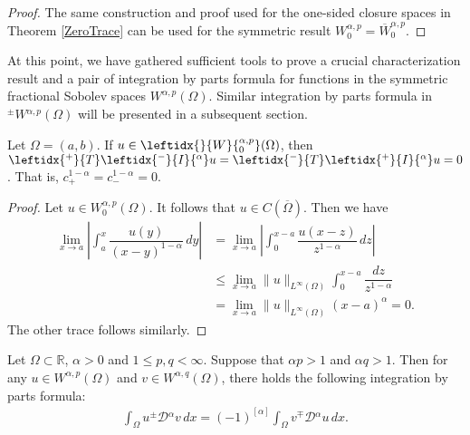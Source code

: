 \documentclass[leqno,final]{siamltex}
\numberwithin{equation}{section}
\newcommand{\Ome}{{\Omega}}
\renewcommand{\(}{\bigl(}
\renewcommand{\)}{\bigr)}
\newcommand{\R}{\mathbb{R}}
\begin{document}
    \begin{proof}
    The same construction and proof used for the one-sided closure spaces in Theorem \ref{ZeroTrace} can be used for the symmetric result $W^{\alpha,p}_{0} = \overline{W}^{\alpha,p}_{0}$.
    \end{proof}
    
    At this point, we have gathered sufficient tools to prove a crucial characterization 
    result and a pair of integration by parts 
    formula for functions in the symmetric fractional Sobolev spaces $W^{\alpha,p}(\Omega)$. Similar integration by parts formula in ${^{\pm}}{W}{^{\alpha,p}}(\Omega)$ will be presented in a subsequent section. 
    
\begin{proposition}\label{ConstantZero}
Let $\Ome=(a,b)$. If $u \in \leftidx{}{W}{^{\alpha,p}_{0}}(\Omega)$, then $\leftidx{^{+}}{T}\leftidx{^{-}}{I}{^{\alpha}} u = \leftidx{^{-}}{T} \leftidx{^{+}}{I}{^{\alpha}} u = 0$. That is, $c^{1-\alpha}_{+} = c^{1-\alpha}_{-} = 0.$
\end{proposition}

\begin{proof}
    Let $u \in W^{\alpha,p}_{0}(\Omega)$. It follows that $u \in C(\overline{\Omega})$.  
    Then we have 
    \begin{align*}
        \lim_{x \rightarrow a} \left|\int_{a}^{x} \dfrac{u(y)}{(x-y)^{1- \alpha}} \,dy \right| &= \lim_{x \rightarrow a} \left| \int_{0}^{x-a} \dfrac{u(x-z)}{z^{1-\alpha}}\,dz \right|\\
        &\leq \lim_{x \rightarrow a} \|u\|_{L^{\infty}(\Omega)} \int_{0}^{x-a} \dfrac{dz}{z^{1-\alpha}} \\ 
        &= \lim_{x\rightarrow a}\|u\|_{L^{\infty}(\Omega)} (x-a)^{\alpha} 
        = 0.
    \end{align*}
    The other trace follows similarly. 
\end{proof}


    \begin{proposition}
        Let $\Omega \subset \R$, $\alpha >0$ and $1 \leq p, q < \infty$. Suppose that $\alpha p> 1$ and $\alpha q> 1$. Then for any $u \in W^{\alpha,p}(\Omega)$ and $v \in W^{\alpha ,q}(\Omega)$, there holds the following integration by parts formula: 
        \begin{align}\label{SymmetricSobolevIBP}
            \int_{\Omega} u {^{\pm}}{\mathcal{D}}{^{\alpha}} v\, dx = (-1)^{[\alpha]} \int_{\Omega} v {^{\mp}}{\mathcal{D}}{^{\alpha}} u\, dx.
        \end{align}
    \end{proposition}
    
\end{document}
